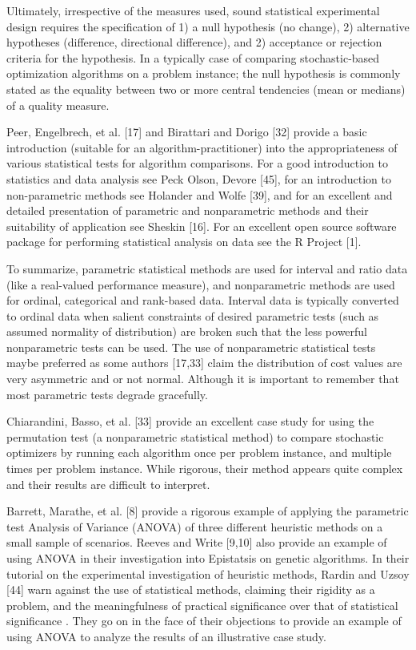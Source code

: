 \documentclass[a4paper, 11pt]{article}
\begin{document}
Ultimately, irrespective of the measures used, sound statistical experimental design requires the specification of 1) a null hypothesis (no change), 2) alternative hypotheses (difference, directional difference), and 2) acceptance or rejection criteria for the hypothesis. In a typically	case	of	comparing	stochastic-based optimization algorithms on a problem instance; the null hypothesis is commonly stated as the equality between two or more central tendencies (mean or medians) of a quality measure.

Peer, Engelbrech, et al. [17] and Birattari and Dorigo [32] provide a basic introduction (suitable for an algorithm-practitioner) into the appropriateness of various statistical tests for algorithm comparisons. For a good introduction to statistics and data analysis see Peck Olson, Devore [45], for an introduction to non-parametric methods see Holander and Wolfe [39], and for an excellent and detailed presentation of parametric and nonparametric methods and their suitability of application see Sheskin [16]. For an excellent open source software package for performing statistical analysis on data see the R Project [1].

To summarize, parametric statistical methods are used for interval and ratio data (like a real-valued performance measure), and nonparametric methods are used for ordinal, categorical and rank-based data. Interval data is typically converted to ordinal data when salient constraints of desired parametric tests (such as assumed normality of distribution) are broken such that the less powerful nonparametric tests can be used. The use of nonparametric statistical tests maybe preferred as some authors [17,33] claim the distribution of cost values are very asymmetric and or not normal. Although it is important to remember that most parametric tests degrade gracefully.

Chiarandini, Basso, et al. [33] provide an excellent case study for using the permutation test (a nonparametric statistical method) to compare stochastic optimizers by running each algorithm once per problem instance, and multiple times per problem instance. While rigorous, their method appears quite complex and their results are difficult to interpret.

Barrett, Marathe, et al. [8] provide a rigorous example of applying the parametric test Analysis of Variance (ANOVA) of three different heuristic methods on a small sample of scenarios. Reeves and Write [9,10] also provide an example of using ANOVA in their investigation into Epistatsis on genetic algorithms. In their tutorial on the experimental investigation of heuristic methods, Rardin and Uzsoy [44] warn against the use of statistical methods, claiming their rigidity as a problem, and the meaningfulness of practical significance over that of statistical significance . They go on in the face of their objections to provide an example of using ANOVA to analyze the results of an illustrative case study.
\end{document}
